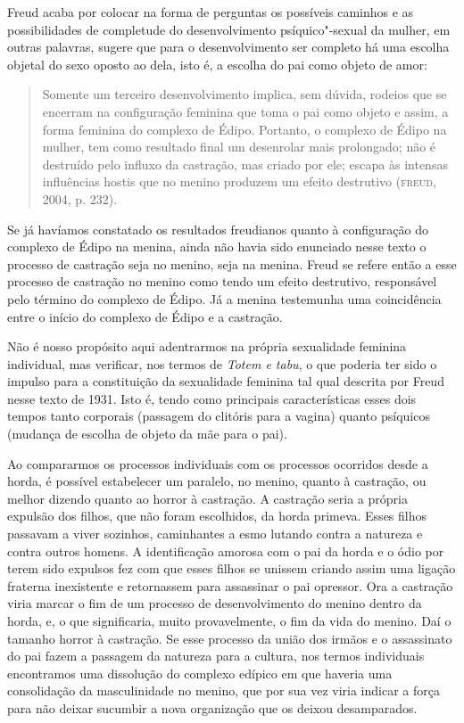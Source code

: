 Freud acaba por colocar na forma de perguntas os possíveis caminhos e as
possibilidades de completude do desenvolvimento psíquico"-sexual da
mulher, em outras palavras, sugere que para o desenvolvimento ser
completo há uma escolha objetal do sexo oposto ao dela, isto é, a
escolha do pai como objeto de amor:

\begin{quote}
Somente um terceiro desenvolvimento implica, sem dúvida, rodeios que se
encerram na configuração feminina que toma o pai como objeto e assim, a
forma feminina do complexo de Édipo. Portanto, o complexo de Édipo na
mulher, tem como resultado final um desenrolar mais prolongado; não é
destruído pelo influxo da castração, mas criado por ele; escapa às
intensas influências hostis que no menino produzem um efeito destrutivo
(\textsc{freud}, 2004, p. 232).
\end{quote}

Se já havíamos constatado os resultados freudianos quanto à configuração
do complexo de Édipo na menina, ainda não havia sido enunciado nesse
texto o processo de castração seja no menino, seja na menina. Freud se
refere então a esse processo de castração no menino como tendo um efeito
destrutivo, responsável pelo término do complexo de Édipo. Já a menina
testemunha uma coincidência entre o início do complexo de Édipo e a
castração.

Não é nosso propósito aqui adentrarmos na própria sexualidade feminina
individual, mas verificar, nos termos de \emph{Totem e tabu}, o que poderia ter
sido o impulso para a constituição da sexualidade feminina tal qual
descrita por Freud nesse texto de 1931. Isto é, tendo como principais
características esses dois tempos tanto corporais (passagem do clitóris
para a vagina) quanto psíquicos (mudança de escolha de objeto da mãe
para o pai).

Ao compararmos os processos individuais com os processos ocorridos desde
a horda, é possível estabelecer um paralelo, no menino, quanto à
castração, ou melhor dizendo quanto ao horror à castração. A castração
seria a própria expulsão dos filhos, que não foram escolhidos, da horda
primeva. Esses filhos passavam a viver sozinhos, caminhantes a esmo
lutando contra a natureza e contra outros homens. A identificação
amorosa com o pai da horda e o ódio por terem sido expulsos fez com que
esses filhos se unissem criando assim uma ligação fraterna inexistente e
retornassem para assassinar o pai opressor. Ora a castração viria marcar
o fim de um processo de desenvolvimento do menino dentro da horda, e, o
que significaria, muito provavelmente, o fim da vida do menino. Daí o
tamanho horror à castração. Se esse processo da união dos irmãos e o
assassinato do pai fazem a passagem da natureza para a cultura, nos
termos individuais encontramos uma dissolução do complexo edípico em
que haveria uma consolidação da masculinidade no menino, que por sua vez
viria indicar a força para não deixar sucumbir a nova organização que os
deixou desamparados.

